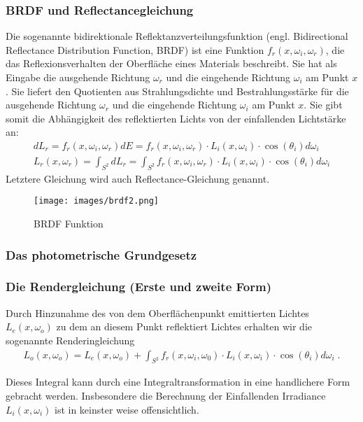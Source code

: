 \subsubsection{BRDF und Reflectancegleichung }
Die sogenannte bidirektionale Reflektanzverteilungsfunktion (engl. Bidirectional Reflectance Distribution Function, BRDF)
ist eine Funktion $f_r (x, \omega_i, \omega_r)$, die das Reflexionsverhalten der Oberfläche eines Materials beschreibt. 
Sie hat als Eingabe die ausgehende Richtung $\omega_r$ und die eingehende Richtung  $\omega_i$ am Punkt $x$. 
Sie  liefert den Quotienten aus Strahlungsdichte und Bestrahlungsstärke für die ausgehende Richtung $\omega_r$ und die eingehende Richtung  $\omega_i$ am Punkt $x$.
Sie gibt somit die Abhängigkeit des reflektierten Lichts von der einfallenden Lichtstärke an: 
\begin{align}
dL_r = f_r(x, \omega_i, \omega_r) dE =   f_r(x, \omega_i, \omega_r)  \cdot  L_i(x,\omega_i) \cdot  \cos(\theta_i) d \omega_i\\
L_r(x, \omega_r) = \int_{S^2} dL_r =    \int_{S^2}f_r (x, \omega_i, \omega_r) \cdot L_i(x, \omega_i) \cdot  \cos(\theta_i) d\omega_i
\end{align}
Letztere Gleichung wird auch Reflectance-Gleichung genannt.
 \begin{figure}[H]
    \centering
    \texttt{[image: images/brdf2.png]}
    \caption{BRDF Funktion}
    \label{fig:raytracin_brdf}
\end{figure}

\subsubsection{Das photometrische Grundgesetz}
 
\subsubsection{Die Rendergleichung (Erste und zweite Form)}

Durch Hinzunahme des von dem Oberflächenpunkt emittierten Lichtes $L_e(x, \omega_o)$ zu dem   an diesem Punkt reflektiert Lichtes erhalten wir die sogenannte Renderingleichung 
\begin{align}
L_o(x, \omega_o) = L_e(x, \omega_o)  + \displaystyle \int_{S^2}f_r (x, \omega_i, \omega_0) \cdot L_i(x, \omega_i)  \cdot  \cos(\theta_i) d\omega_i \; .
\end{align}

Dieses Integral kann durch eine Integraltransformation in eine handlichere Form gebracht werden. Insbesondere die Berechnung der Einfallenden Irradiance  $L_i(x, \omega_i)$  ist in keinster weise offensichtlich. 



